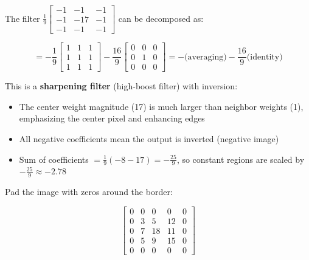 \documentclass[12pt]{article}
\begin{document}
\begin{stepbox}

The filter $\displaystyle\frac{1}{9}\begin{bmatrix} -1 & -1 & -1 \\ -1 & -17 & -1 \\ -1 & -1 & -1 \end{bmatrix}$ can be decomposed as:

\[
= -\frac{1}{9}\begin{bmatrix} 1 & 1 & 1 \\ 1 & 1 & 1 \\ 1 & 1 & 1 \end{bmatrix} - \frac{16}{9}\begin{bmatrix} 0 & 0 & 0 \\ 0 & 1 & 0 \\ 0 & 0 & 0 \end{bmatrix}
= -\text{(averaging)} - \frac{16}{9}\text{(identity)}
\]

This is a \textbf{sharpening filter} (high-boost filter) with inversion:
\begin{itemize}[leftmargin=2em, itemsep=0pt]
    \item The center weight magnitude (17) is much larger than neighbor weights (1), emphasizing the center pixel and enhancing edges
    \item All negative coefficients mean the output is inverted (negative image)
    \item Sum of coefficients $= \frac{1}{9}(-8-17) = -\frac{25}{9}$, so constant regions are scaled by $-\frac{25}{9} \approx -2.78$
\end{itemize}

\end{stepbox}

\begin{stepbox}

Pad the image with zeros around the border:

\[
\begin{bmatrix}
0 & 0 & 0 & 0 & 0 \\
0 & 3 & 5 & 12 & 0 \\
0 & 7 & 18 & 11 & 0 \\
0 & 5 & 9 & 15 & 0 \\
0 & 0 & 0 & 0 & 0
\end{bmatrix}
\]

\end{stepbox}
\end{document}
